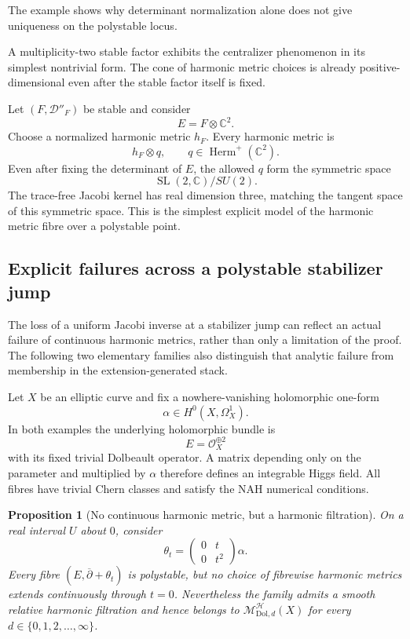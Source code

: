 \documentclass[11pt,reqno]{amsart}
\newtheorem{proposition}[theorem]{Proposition}
\theoremstyle{definition}
\theoremstyle{remark}
\newcommand{\C}{\mathbb C}
\newcommand{\cD}{\mathcal D}
\newcommand{\cH}{\mathcal H}
\newcommand{\Dol}{\mathrm{Dol}}
\newcommand{\ddbar}{\overline\partial}
\begin{document}
The example shows why determinant normalization alone does not give uniqueness on the polystable locus.


A multiplicity-two stable factor exhibits the centralizer phenomenon in its simplest nontrivial form.  The cone of harmonic metric choices is already positive-dimensional even after the stable factor itself is fixed.


Let $(F,\cD''_F)$ be stable and consider
\[
  E=F\otimes\C^2.
\]
Choose a normalized harmonic metric $h_F$.  Every harmonic metric is
\[
  h_F\otimes q,
  \qquad
  q\in\operatorname{Herm}^+(\C^2).
\]
Even after fixing the determinant of $E$, the allowed $q$ form the symmetric space
\[
  \operatorname{SL}(2,\C)/SU(2).
\]
The trace-free Jacobi kernel has real dimension three, matching the tangent space of this symmetric space.  This is the simplest explicit model of the harmonic metric fibre over a polystable point.

\subsection{Explicit failures across a polystable stabilizer jump}\label{sec:explicit-polystable-failures}

The loss of a uniform Jacobi inverse at a stabilizer jump can reflect an actual failure of continuous harmonic metrics, rather than only a limitation of the proof.  The following two elementary families also distinguish that analytic failure from membership in the extension-generated stack.

Let $X$ be an elliptic curve and fix a nowhere-vanishing holomorphic one-form
\[
  \alpha\in H^0(X,\Omega_X^1).
\]
In both examples the underlying holomorphic bundle is
\[
  E=\mathcal O_X^{\oplus2}
\]
with its fixed trivial Dolbeault operator.  A matrix depending only on the parameter and multiplied by $\alpha$ therefore defines an integrable Higgs field.  All fibres have trivial Chern classes and satisfy the NAH numerical conditions.

\begin{proposition}[No continuous harmonic metric, but a harmonic filtration]\label{prop:coalescing-lines-filtered}
On a real interval $U$ about $0$, consider
\begin{equation}\label{eq:triangular-polystable-family}
  \theta_t
  =
  \begin{pmatrix}
    0&t\\
    0&t^2
  \end{pmatrix}\alpha.
\end{equation}
Every fibre $(E,\ddbar+\theta_t)$ is polystable, but no choice of fibrewise harmonic metrics extends continuously through $t=0$.  Nevertheless the family admits a smooth relative harmonic filtration and hence belongs to $\mathscr M_{\Dol,d}^{\cH}(X)$ for every $d\in\{0,1,2,\ldots,\infty\}$.
\end{proposition}
\end{document}
